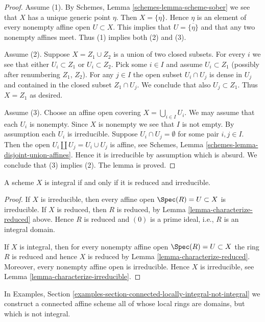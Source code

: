 \begin{proof}
Assume (1). By Schemes, Lemma \ref{schemes-lemma-scheme-sober}
we see that $X$ has a unique generic point $\eta$. Then
$X = \overline{\{\eta\}}$. Hence $\eta$ is an element of
every nonempty affine open $U \subset X$. This implies
that $U = \overline{\{\eta\}}$ and that any two nonempty affines
meet. Thus (1) implies both (2) and (3).

\medskip\noindent
Assume (2). Suppose $X = Z_1 \cup Z_2$ is a union of two closed subsets.
For every $i$ we see that either $U_i \subset Z_1$ or $U_i \subset Z_2$.
Pick some $i \in I$ and assume $U_i \subset Z_1$ (possibly after renumbering
$Z_1$, $Z_2$). For any $j \in I$ the open subset $U_i \cap U_j$ is dense in
$U_j$ and contained in the closed subset $Z_1 \cap U_j$. We conclude that
also $U_j \subset Z_1$. Thus $X = Z_1$ as desired.

\medskip\noindent
Assume (3). Choose an affine open covering $X = \bigcup_{i \in I} U_i$.
We may assume that each $U_i$ is nonempty.
Since $X$ is nonempty we see that $I$ is not empty.
By assumption each $U_i$ is irreducible.
Suppose $U_i \cap U_j = \emptyset$ for some pair $i, j \in I$.
Then the open $U_i \amalg  U_j = U_i \cup U_j$ is affine, see
Schemes, Lemma \ref{schemes-lemma-disjoint-union-affines}.
Hence it is irreducible by assumption which is absurd. We conclude that (3)
implies (2). The lemma is proved.
\end{proof}

\begin{lemma}
\label{lemma-characterize-integral}
A scheme $X$ is integral if and only if it is reduced and irreducible.
\end{lemma}

\begin{proof}
If $X$ is irreducible, then every affine open $\Spec(R) = U \subset X$
is irreducible. If $X$ is reduced, then $R$ is reduced, by
Lemma \ref{lemma-characterize-reduced} above. Hence $R$ is reduced
and $(0)$ is a prime ideal, i.e., $R$ is an integral domain.

\medskip\noindent
If $X$ is integral, then for every nonempty affine open
$\Spec(R) = U \subset X$ the ring $R$ is reduced
and hence $X$ is reduced by Lemma \ref{lemma-characterize-reduced}.
Moreover, every nonempty affine open is irreducible.
Hence $X$ is irreducible, see Lemma \ref{lemma-characterize-irreducible}.
\end{proof}

\noindent
In Examples, Section
\ref{examples-section-connected-locally-integral-not-integral}
we construct a connected affine scheme all of whose local rings are domains,
but which is not integral.











